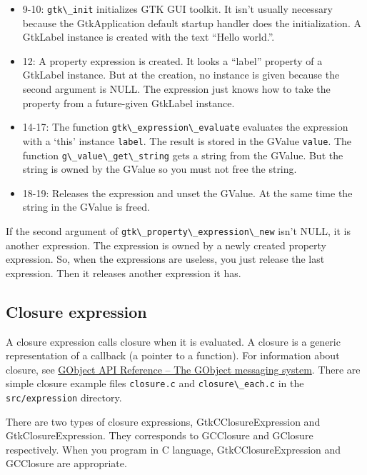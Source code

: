 \begin{itemize}
\tightlist
\item
  9-10: \passthrough{\lstinline!gtk\_init!} initializes GTK GUI toolkit.
  It isn't usually necessary because the GtkApplication default startup
  handler does the initialization. A GtkLabel instance is created with
  the text ``Hello world.''.
\item
  12: A property expression is created. It looks a ``label'' property of
  a GtkLabel instance. But at the creation, no instance is given because
  the second argument is NULL. The expression just knows how to take the
  property from a future-given GtkLabel instance.
\item
  14-17: The function
  \passthrough{\lstinline!gtk\_expression\_evaluate!} evaluates the
  expression with a `this' instance \passthrough{\lstinline!label!}. The
  result is stored in the GValue \passthrough{\lstinline!value!}. The
  function \passthrough{\lstinline!g\_value\_get\_string!} gets a string
  from the GValue. But the string is owned by the GValue so you must not
  free the string.
\item
  18-19: Releases the expression and unset the GValue. At the same time
  the string in the GValue is freed.
\end{itemize}

If the second argument of
\passthrough{\lstinline!gtk\_property\_expression\_new!} isn't NULL, it
is another expression. The expression is owned by a newly created
property expression. So, when the expressions are useless, you just
release the last expression. Then it releases another expression it has.

\subsection{Closure expression}\label{closure-expression}

A closure expression calls closure when it is evaluated. A closure is a
generic representation of a callback (a pointer to a function). For
information about closure, see
\href{https://docs.gtk.org/gobject/concepts.html\#the-gobject-messaging-system}{GObject
API Reference -- The GObject messaging system}. There are simple closure
example files \passthrough{\lstinline!closure.c!} and
\passthrough{\lstinline!closure\_each.c!} in the
\passthrough{\lstinline!src/expression!} directory.

There are two types of closure expressions, GtkCClosureExpression and
GtkClosureExpression. They corresponds to GCClosure and GClosure
respectively. When you program in C language, GtkCClosureExpression and
GCClosure are appropriate.

